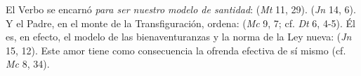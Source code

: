 	 El Verbo se encarnó \emph{para ser nuestro modelo de santidad}:  (\emph{Mt} 11, 29).  (\emph{Jn} 14, 6). Y el Padre, en el monte de la Transfiguración, ordena:  (\emph{Mc} 9, 7; cf. \emph{Dt} 6, 4-5). Él es, en efecto, el modelo de las bienaventuranzas y la norma de la Ley nueva:  (\emph{Jn} 15, 12). Este amor tiene como consecuencia la ofrenda efectiva de sí mismo (cf. \emph{Mc} 8, 34).